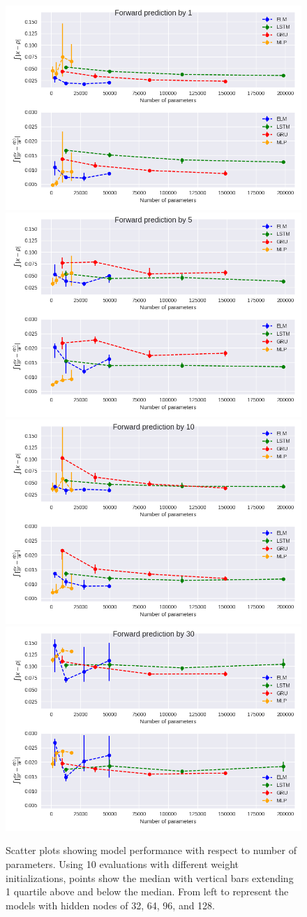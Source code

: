 \documentclass[11pt]{article}
\begin{document}
  \begin{figure}
    \begin{center}
   \includegraphics[width=.48\textwidth]{figures/mg1_scatter_1.png}
   \includegraphics[width=.48\textwidth]{figures/mg1_scatter_5.png}
   \includegraphics[width=.48\textwidth]{figures/mg1_scatter_10.png}
   \includegraphics[width=.48\textwidth]{figures/mg1_scatter_30.png}
    
    \caption{Scatter plots showing model performance with respect to
      number of parameters. Using 10 evaluations with different weight
    initializations, points show the median with vertical bars
    extending 1 quartile above and below the median. From left to
    represent the models with hidden nodes of 32, 64, 96, and 128.}
    \label{fig:mg1}
    \end{center}
  \end{figure}
\end{document}
